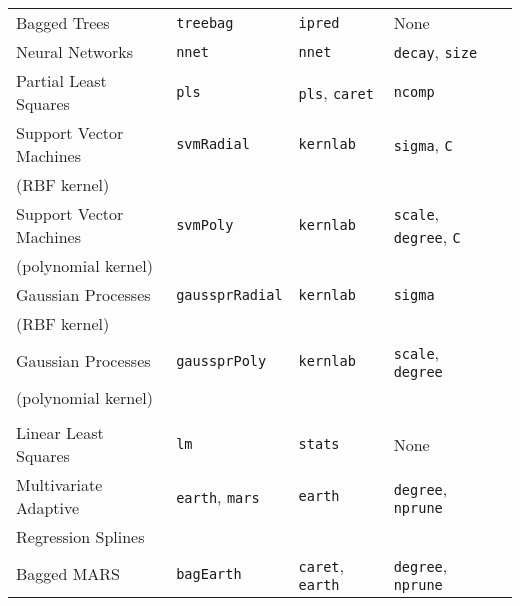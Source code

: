 \documentclass[12pt]{article}
\begin{document}
\begin{longtable}{lllll}
      Bagged Trees &
         \texttt{treebag} & 
            \texttt{ipred}       & 
            None \\                         
                        
      Neural Networks &               
         \texttt{nnet} & 
            \texttt{nnet}       &       
            \texttt{decay}, \texttt{size} \\      
      
      Partial Least Squares &
         \texttt{pls} & 
            \texttt{pls}, \texttt{caret}       & 
            \texttt{ncomp} \\      
      
      Support Vector Machines  &
         \texttt{svmRadial} & 
            \texttt{kernlab}       & 
            \texttt{sigma}, \texttt{C} \\            
      \:\: (RBF kernel) & & &\\   
      
      Support Vector Machines  &
         \texttt{svmPoly} & 
            \texttt{kernlab}       & 
            \texttt{scale}, \texttt{degree}, \texttt{C} \\            
      \:\: (polynomial kernel) & & &\\  
     Gaussian Processes  &
         \texttt{gaussprRadial} & 
            \texttt{kernlab}       & 
            \texttt{sigma} \\            
      \:\: (RBF kernel) & & &\\   
      
      Gaussian Processes  &
         \texttt{gaussprPoly} & 
            \texttt{kernlab}       & 
            \texttt{scale}, \texttt{degree} \\            
      \:\: (polynomial kernel) & & &\\          
      \\
      Linear Least Squares &
         \texttt{lm} & 
            \texttt{stats}       & 
            None \\         
      
      Multivariate Adaptive  &
         \texttt{earth}, \texttt{mars} & 
            \texttt{earth}       & 
            \texttt{degree}, \texttt{nprune} \\            
      \:\: Regression Splines & & &\\
            
      Bagged MARS &
         \texttt{bagEarth} & 
            \texttt{caret},  \texttt{earth}      & 
            \texttt{degree}, \texttt{nprune} \\          
      

\end{longtable}
\end{document}
